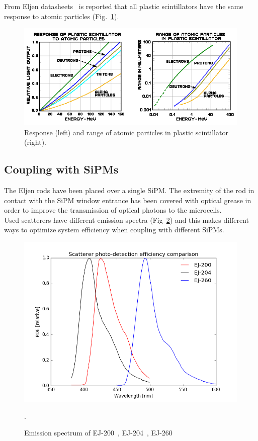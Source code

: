 \documentclass[10pt,a4paper, openany]{book}
\begin{document}
From Eljen datasheets~\cite{ej:3} is reported that all plastic scintillators have the same response to atomic particles (Fig.~\ref{fig:resp}).

\begin{figure}[!h]
\begin{center}
\includegraphics[scale=0.8]{imm/response.png}
\end{center}
\caption{Response (left) and range of atomic particles in plastic scintillator (right).~\cite{ej:3}} 
\label{fig:resp}
\end{figure}

\subsection{Coupling with SiPMs}
The Eljen rods have been placed over a single SiPM. The extremity of the rod in contact with the SiPM window entrance has been covered with optical grease in order to improve the transmission of optical photons to the microcells.\\
Used scatterers have different emission spectra (Fig~\ref{fig:ejconf}) and this makes different ways to optimize system efficiency when coupling with different SiPMs. 


\begin{figure}[!h]
\begin{center}
\includegraphics[scale=0.48]{imm/ej_conf.png}
\end{center}
\caption{Emission spectrum of EJ-200~\cite{ej:3}, EJ-204~\cite{ej:204}, EJ-260~\cite{ej:260}}. 
\label{fig:ejconf}
\end{figure}
\end{document}
